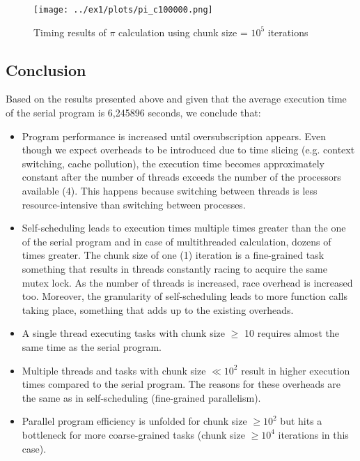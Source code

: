 \documentclass{article}
\begin{document}
\begin{figure}[htbp]
  \centering
  \texttt{[image: ../ex1/plots/pi\_c100000.png]}
  \caption{Timing results of $\pi$ calculation using chunk size = $10^5$ iterations}
\end{figure}

\pagebreak

\subsection{Conclusion}
Based on the results presented above and given that the average execution time of the serial
program is 6,245896 seconds, we conclude that:

\begin{itemize}
 \item Program performance is increased until oversubscription appears. Even though we expect
       overheads to be introduced due to time slicing (e.g. context switching, cache pollution),
       the execution time becomes approximately constant after the number of threads exceeds
       the number of the processors available (4). This happens because switching between
       threads is less resource-intensive than switching between processes.
 \item Self-scheduling leads to execution times multiple times greater than the one of the
       serial program and in case of multithreaded calculation, dozens of times greater.
       The chunk size of one (1) iteration is a fine-grained task something that results
       in threads constantly racing to acquire the same mutex lock. As the number of threads
       is increased, race overhead is increased too. Moreover, the granularity of self-scheduling
       leads to more function calls taking place, something that adds up to the existing overheads.
 \item A single thread executing tasks with chunk size $\geq$ 10 requires almost the same time
       as the serial program.
 \item Multiple threads and tasks with chunk size $\ll 10^2$ result in higher execution times
       compared to the serial program. The reasons for these overheads are the same as in
       self-scheduling (fine-grained parallelism).
 \item Parallel program efficiency is unfolded for chunk size $\geq 10^2$ but hits a bottleneck
       for more coarse-grained tasks (chunk size $\geq 10^4$ iterations in this case).
\end{itemize}
\end{document}

